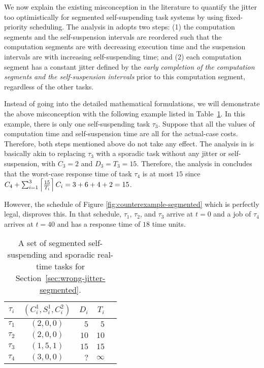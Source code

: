 We now explain the existing misconception in the literature to quantify the jitter too optimistically for segmented self-suspending task systems by using fixed-priority scheduling.  The analysis in \cite{RTCSA-BletsasA05} adopts two steps: (1) the computation segments and the self-suspension intervals are reordered such that the computation segments are with decreasing execution time and the suspension intervals are with increasing self-suspending time; and (2) each computation segment has a constant jitter defined by the \emph{early completion of the computation segments and the self-suspension intervals} prior to this computation segment, regardless of the other tasks. 

Instead of going into the detailed mathematical formulations, we will demonstrate the above misconception with the following example listed in Table~\ref{tab:counterexample-segmented}.
In this example, there is only one self-suspending task $\tau_3$. Suppose that all the values of computation time and self-suspension time are all for the actual-case costs. Therefore, both steps mentioned above do not take any effect. The analysis in \cite{RTCSA-BletsasA05} is basically akin to replacing $\tau_3$ with a sporadic task without any jitter or self-suspension, with $C_3=2$ and $D_3=T_3=15$. Therefore, the analysis in \cite{RTCSA-BletsasA05}  concludes that the worst-case response time of task $\tau_4$ is at most $15$ since $C_4+\sum_{i=1}^{3}\left\lceil{\frac{15}{T_i}}\right\rceil C_i = 3+ 6 + 4 + 2= 15$.


However, the schedule of Figure \ref{fig:counterexample-segmented} which is perfectly legal, disproves this.
In that schedule, $\tau_1$, $\tau_2$, and $\tau_3$ arrive at $t=0$ and a job of $\tau_4$ arrives at $t=40$ and has a response time of 
$18$ time units.

\begin{table}[t]
\begin{center}
\begin{tabular}{|c||c|r|r|r|}
\hline
$\tau_i$ & $(C_i^1, S_i^1, C_i^2)$   &   $D_i$  &     $T_i$     \\ \hline
$\tau_1$ &  $(2, 0, 0)$                    &     $5$  &       $5$     \\ \hline
$\tau_2$ &  $(2, 0, 0)$                    &    $10$  &      $10$     \\ \hline
$\tau_3$ &  $(1, 5, 1)$            &    $15$  &      $15$     \\ \hline
$\tau_4$ &  $(3, 0, 0)$                   &    $?$  &   $\infty$    \\ \hline     
\end{tabular}
\end{center}
\caption{A set of segmented self-suspending and sporadic real-time tasks for Section~\ref{sec:wrong-jitter-segmented}.}
\label{tab:counterexample-segmented}
\end{table}

